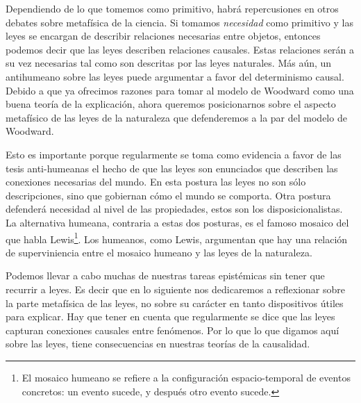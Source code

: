 Dependiendo de lo que tomemos como primitivo, habrá repercusiones en otros debates sobre metafísica de la ciencia. Si tomamos \emph{necesidad} como primitivo y las leyes se encargan de describir relaciones necesarias entre objetos, entonces podemos decir que las leyes describen relaciones causales. Estas relaciones serán a su vez necesarias tal como son descritas por las leyes naturales. Más aún, un antihumeano sobre las leyes puede argumentar a favor del determinismo causal. Debido a que ya ofrecimos razones para tomar al modelo de Woodward como una buena teoría de la explicación, ahora queremos posicionarnos sobre el aspecto metafísico de las leyes de la naturaleza que defenderemos a la par del modelo de Woodward.

Esto es importante porque regularmente se toma como evidencia a favor de las tesis anti-humeanas el hecho de que las leyes son enunciados que describen las conexiones necesarias del mundo. En esta postura las leyes no son sólo descripciones, sino que gobiernan cómo el mundo se comporta\cite{Bhogal2020}. Otra postura defenderá necesidad al nivel de las propiedades, estos son los disposicionalistas. La alternativa humeana, contraria a estas dos posturas, es el famoso mosaico del que habla Lewis\footnote{El mosaico humeano se refiere a la configuración espacio-temporal de eventos concretos: un evento sucede, y después otro evento sucede.}. Los humeanos, como Lewis, argumentan que hay una relación de superviniencia entre el mosaico humeano y las leyes de la naturaleza.


Podemos llevar a cabo muchas de nuestras tareas epistémicas sin tener que recurrir a leyes. Es decir que en lo siguiente nos dedicaremos a reflexionar sobre la parte metafísica de las leyes, no sobre su carácter en tanto dispositivos útiles para explicar. Hay que tener en cuenta que regularmente se dice que las leyes capturan conexiones causales entre fenómenos. Por lo que lo que digamos aquí sobre las leyes, tiene consecuencias en nuestras teorías de la causalidad.

